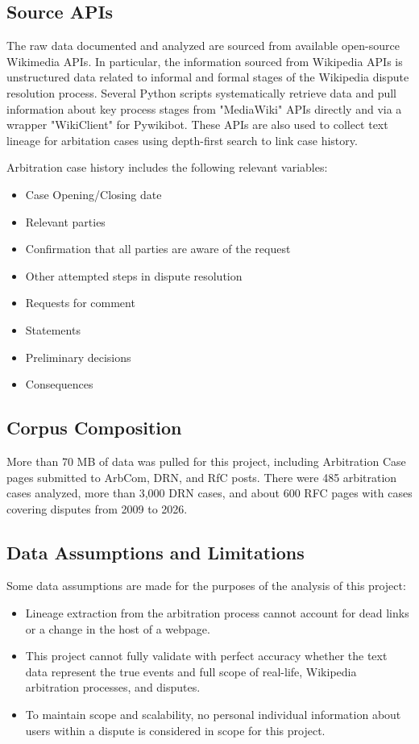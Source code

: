 \documentclass[conference]{IEEEtran}
\begin{document}
\subsection{Source APIs}
The raw data documented and analyzed are sourced from available open-source Wikimedia APIs. In particular, the information sourced from Wikipedia APIs is unstructured data related to informal and formal stages of the Wikipedia dispute resolution process. Several Python scripts systematically retrieve data and pull information about key process stages from "MediaWiki" APIs directly and via a wrapper "WikiClient" for Pywikibot. These APIs are also used to collect text lineage for arbitation cases using depth-first search to link case history.

Arbitration case history includes the following relevant variables:
\begin{itemize}
    \item Case Opening/Closing date
    \item Relevant parties
    \item Confirmation that all parties are aware of the request
    \item Other attempted steps in dispute resolution
    \item Requests for comment
    \item Statements
    \item Preliminary decisions
    \item Consequences
\end{itemize}

\subsection{Corpus Composition}
More than 70 MB of data was pulled for this project, including Arbitration Case pages submitted to ArbCom, DRN, and RfC posts. There were 485 arbitration cases analyzed, more than 3,000 DRN cases, and about 600 RFC pages with cases covering disputes from 2009 to 2026.

\subsection{Data Assumptions and Limitations}
Some data assumptions are made for the purposes of the analysis of this project:
\begin{itemize}
    \item Lineage extraction from the arbitration process cannot account for dead links or a change in the host of a webpage.
    \item This project cannot fully validate with perfect accuracy whether the text data represent the true events and full scope of real-life, Wikipedia arbitration processes, and disputes.
    \item To maintain scope and scalability, no personal individual information about users within a dispute is considered in scope for this project.
\end{itemize}
\end{document}
